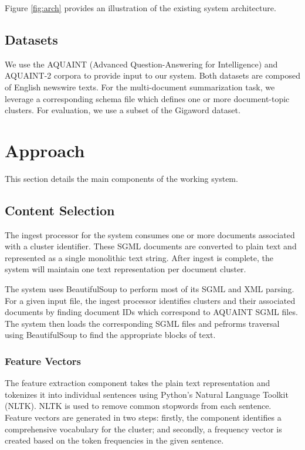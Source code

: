 \documentclass[11pt]{article}
\begin{document}
Figure \ref{fig:arch} provides an illustration of the existing system architecture.

\subsection{Datasets}
We use the AQUAINT (Advanced Question-Answering for Intelligence) and AQUAINT-2 corpora to provide input to our system. Both datasets are composed of English newswire texts. For the multi-document summarization task, we leverage a corresponding schema file which defines one or more document-topic clusters. For evaluation, we use a subset of the Gigaword dataset.

\section{Approach}

This section details the main components of the working system.

\subsection{Content Selection}
The ingest processor for the system consumes one or more documents associated with a cluster identifier. These SGML documents are converted to plain text and represented as a single monolithic text string. After ingest is complete, the system will maintain one text representation per document cluster.

The system uses BeautifulSoup to perform most of its SGML and XML parsing. For a given input file, the ingest processor identifies clusters and their associated documents by finding document IDs which correspond to AQUAINT SGML files. The system then loads the corresponding SGML files and pefrorms traversal using BeautifulSoup to find the appropriate blocks of text.
\subsubsection{Feature Vectors}
The feature extraction component takes the plain text representation and tokenizes it into individual sentences using Python's Natural Language Toolkit (NLTK). NLTK is used to remove common stopwords from each sentence. Feature vectors are generated in two steps: firstly, the component identifies a comprehensive vocabulary for the cluster; and secondly, a frequency vector is created based on the token frequencies in the given sentence. 
\end{document}
